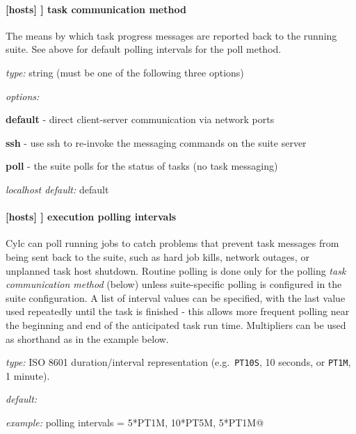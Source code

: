 \paragraph[task communication method]{[hosts] \textrightarrow [[HOST]] \textrightarrow task communication method }
\label{task_comms_method}

The means by which task progress messages are reported back to the running suite.
See above for default polling intervals for the poll method.

\begin{myitemize}
\item {\em type:} string (must be one of the following three options)
\item {\em options:}
    \begin{myitemize}
    \item {\bf default} - direct client-server communication via network ports
    \item {\bf ssh} - use ssh to re-invoke the messaging commands on the suite server
    \item {\bf poll} - the suite polls for the status of tasks (no task messaging)
  \end{myitemize}
\item {\em localhost default:} default
\end{myitemize}

\paragraph[execution polling intervals]{[hosts] \textrightarrow [[HOST]] \textrightarrow execution polling intervals}
\label{execution_polling}

Cylc can poll running jobs to catch problems that prevent task messages
from being sent back to the suite, such as hard job kills, network
outages, or unplanned task host shutdown. Routine polling is done only
for the polling {\em task communication method} (below) unless
suite-specific polling is configured in the suite configuration.
A list of interval values can be specified, with the last value used
repeatedly until the task is finished - this allows more frequent
polling near the beginning and end of the anticipated task run time.
Multipliers can be used as shorthand as in the example below.

\begin{myitemize}
\item {\em type:} ISO 8601 duration/interval representation (e.g.\ 
\lstinline=PT10S=, 10 seconds, or \lstinline=PT1M=, 1 minute).
\item {\em default:}
\item {\em example:} \lstinline@execution polling intervals = 5*PT1M, 10*PT5M, 5*PT1M@
\end{myitemize}


